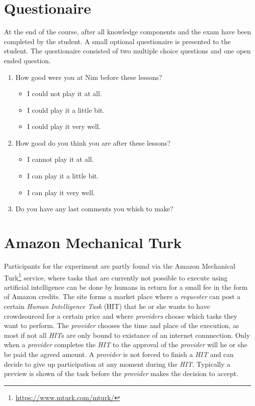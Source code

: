 \section{Questionaire}
At the end of the course, after all knowledge components and the exam have been
completed by the student. A small optional questionaire is presented to the
student. The questionaire consisted of two multiple choice questions and one
open ended question.
\begin{enumerate}
	\item How good were you at Nim before these lessons?
		\begin{itemize}
			\item I could not play it at all.
			\item I could play it a little bit.
			\item I could play it very well.
		\end{itemize}
	\item How good do you think you are after these lessons?
		\begin{itemize}
			\item I cannot play it at all.
			\item I can play it a little bit.
			\item I can play it very well.
		\end{itemize}
	\item Do you have any last comments you whish to make?
\end{enumerate}
\section{Amazon Mechanical Turk}
Participants for the experiment are partly found via the Amazon Mechanical
Turk\footnote{\url{https://www.mturk.com/mturk/}} service, where tasks that are
currently not possible to execute using artificial intelligence can be done by
humans in return for a small fee in the form of Amazon credits. The site forms
a market place where a \emph{requester} can post a certain \emph{Human
Intelligence Task} (HIT) that he or she wants to have crowdsourced for a
certain price and where \emph{providers} choose which tasks they want to perform.
The \emph{provider} chooses the time and place of the execution, as most if not
all \emph{HIT}s are only bound to existance of an internet connnection. Only
when a \emph{provider} completes the \emph{HIT} to the approval of the
\emph{provider} will he or she be paid the agreed amount. A \emph{provider} is
not forced to finish a \emph{HIT} and can decide to give up participation at
any moment during the \emph{HIT}. Typically a preview is shown of the task
before the \emph{provider} makes the decision to accept.

